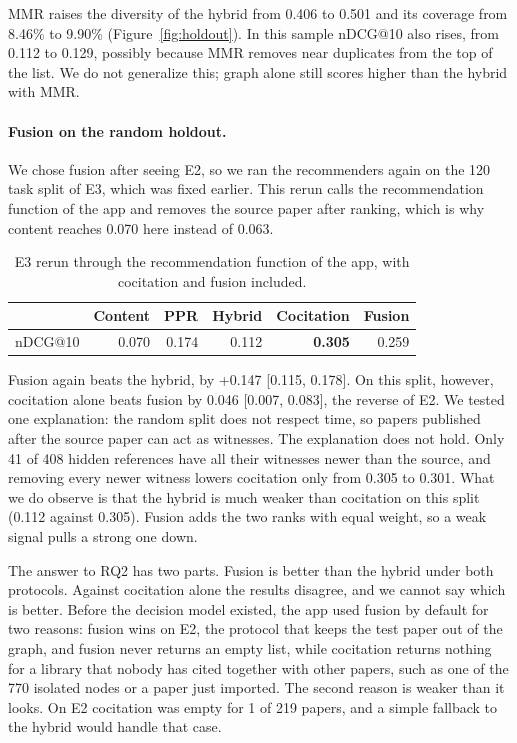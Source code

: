 \documentclass[11pt,a4paper]{article}
\begin{document}
MMR raises the diversity of the hybrid from 0.406 to 0.501 and its coverage from 8.46\% to 9.90\% (Figure~\ref{fig:holdout}). In this sample nDCG@10 also rises, from 0.112 to 0.129, possibly because MMR removes near duplicates from the top of the list. We do not generalize this; graph alone still scores higher than the hybrid with MMR.

\paragraph{Fusion on the random holdout.} We chose fusion after seeing E2, so we ran the recommenders again on the 120 task split of E3, which was fixed earlier. This rerun calls the recommendation function of the app and removes the source paper after ranking, which is why content reaches 0.070 here instead of 0.063.
\begin{table}[htbp]\centering\small
\begin{tabular}{@{}lrrrrr@{}}\toprule
 & Content & PPR & Hybrid & Cocitation & Fusion\\\midrule
nDCG@10 & 0.070 & 0.174 & 0.112 & \textbf{0.305} & 0.259\\\bottomrule
\end{tabular}\caption{E3 rerun through the recommendation function of the app, with cocitation and fusion included.}\label{tab:holdoutfusion}\end{table}
Fusion again beats the hybrid, by +0.147 [0.115, 0.178]. On this split, however, cocitation alone beats fusion by 0.046 [0.007, 0.083], the reverse of E2. We tested one explanation: the random split does not respect time, so papers published after the source paper can act as witnesses. The explanation does not hold. Only 41 of 408 hidden references have all their witnesses newer than the source, and removing every newer witness lowers cocitation only from 0.305 to 0.301. What we do observe is that the hybrid is much weaker than cocitation on this split (0.112 against 0.305). Fusion adds the two ranks with equal weight, so a weak signal pulls a strong one down.

The answer to RQ2 has two parts. Fusion is better than the hybrid under both protocols. Against cocitation alone the results disagree, and we cannot say which is better. Before the decision model existed, the app used fusion by default for two reasons: fusion wins on E2, the protocol that keeps the test paper out of the graph, and fusion never returns an empty list, while cocitation returns nothing for a library that nobody has cited together with other papers, such as one of the 770 isolated nodes or a paper just imported. The second reason is weaker than it looks. On E2 cocitation was empty for 1 of 219 papers, and a simple fallback to the hybrid would handle that case.
\end{document}
